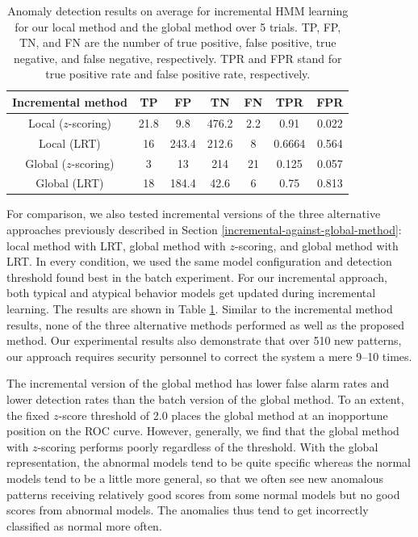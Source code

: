 \begin{table}[t]
  \caption[Anomaly detection results on average for incremental HMM
    learning for our local method and the global method over 5
    trials.]{\small Anomaly detection results on average for
    incremental HMM learning for our local method and the global
    method over 5 trials. TP, FP, TN, and FN are the number of true positive, 
    false positive, true negative, and false negative, respectively. 
    TPR and FPR stand for true positive rate and false positive rate, 
    respectively.}
  \begin{center}
    \begin{tabular}{c|c|c|c|c|c|c}
      \hline
      Incremental method & TP & FP & TN & FN & TPR & FPR \\
      \hline \hline
      Local ($z$-scoring) & 21.8 & 9.8  & 476.2  & 2.2 & 0.91 & 0.022 \\ \hline
      Local (LRT) & 16 & 243.4 & 212.6 & 8 & 0.6664 & 0.564 \\ \hline
      Global ($z$-scoring)  & 3 & 13 & 214 & 21 & 0.125 & 0.057 \\ \hline
      Global (LRT)  & 18 & 184.4 & 42.6 & 6 & 0.75 & 0.813 \\ \hline
    \end{tabular}
  \end{center}
  \label{tab:iml-detection-results}
\end{table}

For comparison, we also tested incremental versions of the three
alternative approaches previously described in Section
\ref{incremental-against-global-method}: local method with LRT, global method
with $z$-scoring, and global method with LRT. In every condition, we
used the same model configuration and detection threshold found best
in the batch experiment.  For our incremental approach, both typical
and atypical behavior models get updated during incremental learning.
The results are shown in Table \ref{tab:iml-detection-results}.
Similar to the incremental method results, none of the three alternative
methods performed as well as the proposed method. Our experimental
results also demonstrate that over 510 new patterns, our approach
requires security personnel to correct the system a mere 9--10 times.

The incremental version of the global method has lower false alarm
rates and lower detection rates than the batch version of the global
method. To an extent, the fixed $z$-score threshold of 2.0 places the
global method at an inopportune position on the ROC curve. However,
generally, we find that the global method with $z$-scoring performs
poorly regardless of the threshold. With the global representation,
the abnormal models tend to be quite specific whereas the normal
models tend to be a little more general, so that we often see new
anomalous patterns receiving relatively good scores from some normal
models but no good scores from abnormal models. The anomalies thus
tend to get incorrectly classified as normal more often.

